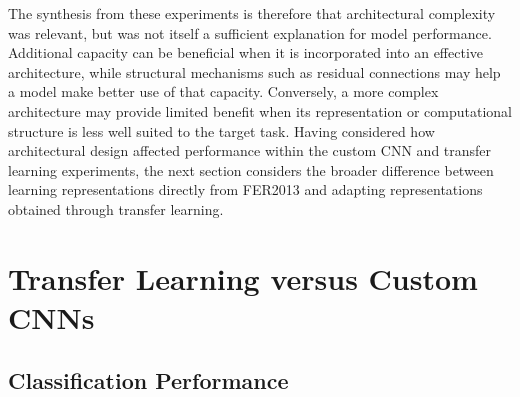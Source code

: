 \documentclass[12pt, a4paper]{report}
\let\oldsection\section
\renewcommand{\section}{%
    \Needspace{6\baselineskip}%
    \oldsection
}
\let\oldsubsection\subsection
\renewcommand{\subsection}{%
    \Needspace{6\baselineskip}%
    \oldsubsection
}
\begin{document}
				The synthesis from these experiments is therefore that architectural complexity was relevant, but was not itself a sufficient explanation for model performance. Additional capacity can be beneficial when it is incorporated into an effective architecture, while structural mechanisms such as residual connections may help a model make better use of that capacity. Conversely, a more complex architecture may provide limited benefit when its representation or computational structure is less well suited to the target task. Having considered how architectural design affected performance within the custom CNN and transfer learning experiments, the next section considers the broader difference between learning representations directly from FER2013 and adapting representations obtained through transfer learning.
				
		\section{Transfer Learning versus Custom CNNs}
			
			\subsection{Classification Performance}
				
\end{document}
